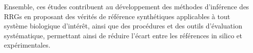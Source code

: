 Ensemble, ces études contribuent au développement des méthodes d’inférence des RRGs en proposant des vérités de référence synthétiques applicables à tout système biologique d’intérêt, ainsi que des procédures et des outils d’évaluation systématique, permettant ainsi de réduire l’écart entre les références in silico et expérimentales.
